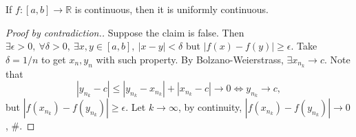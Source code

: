 \begin{lemma}\label{lma:5.5}
    If $ f:[a,b]\to \mathbb{R}  $ is continuous, then it is uniformly continuous.
\end{lemma}
\begin{proof}[Proof by contradiction.]
    Suppose the claim is false. Then $ \exists \epsilon>0,\ \forall \delta>0,\ \exists x,y\in [a,b],\ |x-y|<\delta $ but $ |f(x)-f(y)|\ge \epsilon $. Take $ \delta=1/n $ to get $ x_n,y_n $ with such property. By Bolzano-Weierstrass, $ \exists x_{n_k}\to c $. Note that 
    \[
        |y_{n_k}-c|\le |y_{n_k}-x_{n_k}|+|x_{n_k}-c|\to 0 \Longleftrightarrow y_{n_k}\to c,
    \]
    but $ |f(x_{n_k})-f(y_{n_k})|\ge \epsilon $. Let $ k\to \infty $, by continuity, $ |f(x_{n_k})-f(y_{n_k})|\to 0 $, \#.
\end{proof}

